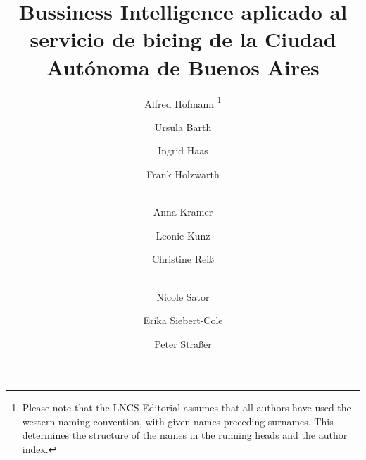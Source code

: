 \documentclass[runningheads,a4paper,spanish]{llncs}
\begin{document}
\mainmatter  %

\title{Bussiness Intelligence aplicado al servicio de bicing de la Ciudad Autónoma de Buenos Aires}


%
%
\author{Alfred Hofmann%
\thanks{Please note that the LNCS Editorial assumes that all authors have used
the western naming convention, with given names preceding surnames. This determines
the structure of the names in the running heads and the author index.}%
\and Ursula Barth\and Ingrid Haas\and Frank Holzwarth\and\\
Anna Kramer\and Leonie Kunz\and Christine Rei\ss\and\\
Nicole Sator\and Erika Siebert-Cole\and Peter Stra\ss er}
%


\maketitle
\end{document}
